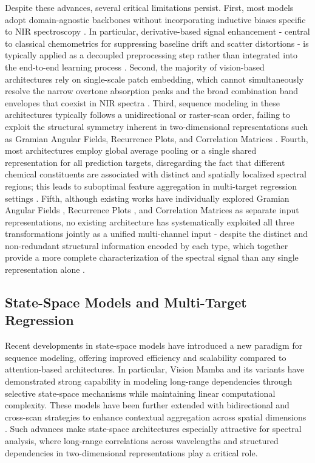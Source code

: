 \documentclass[pdflatex,sn-mathphys-num]{sn-jnl}%
\begin{document}
Despite these advances, several critical limitations persist. First, most models adopt domain-agnostic backbones without incorporating inductive biases specific to NIR spectroscopy \cite{zhang2022review, wang2025nirs}. In particular, derivative-based signal enhancement - central to classical chemometrics for suppressing baseline drift and scatter distortions - is typically applied as a decoupled preprocessing step rather than integrated into the end-to-end learning process \cite{yan2025review, zhang2022review}. Second, the majority of vision-based architectures rely on single-scale patch embedding, which cannot simultaneously resolve the narrow overtone absorption peaks and the broad combination band envelopes that coexist in NIR spectra \cite{pan2024multi, liu2024mspe, li2025multi}. Third, sequence modeling in these architectures typically follows a unidirectional or raster-scan order, failing to exploit the structural symmetry inherent in two-dimensional representations such as Gramian Angular Fields, Recurrence Plots, and Correlation Matrices \cite{mariani2025fusion, deev2024spectrum}. Fourth, most architectures employ global average pooling or a single shared representation for all prediction targets, disregarding the fact that different chemical constituents are associated with distinct and spatially localized spectral regions; this leads to suboptimal feature aggregation in multi-target regression settings \cite{MISHRA2022111741, zhang2022review}. Fifth, although existing works have individually explored Gramian Angular Fields \cite{li2024combined,zhang2025near}, Recurrence Plots \cite{liu2025effective, deev2024spectrum}, and Correlation Matrices \cite{yan2022two, hosseinpour2023cnn} as separate input representations, no existing architecture has systematically exploited all three transformations jointly as a unified multi-channel input - despite the distinct and non-redundant structural information encoded by each type, which together provide a more complete characterization of the spectral signal than any single 
representation alone \cite{zhao2024multiscale}.


\subsection{State-Space Models and Multi-Target Regression}
Recent developments in state-space models have introduced a new paradigm for sequence modeling, offering improved efficiency and scalability compared to attention-based architectures. In particular, Vision Mamba \cite{zhu2024vision} and its variants \cite{bao2026vision,liu2024vmamba,liao2025specspatmamba} have demonstrated strong capability in modeling long-range dependencies through selective state-space mechanisms while maintaining linear computational complexity. These models have been further extended with bidirectional and cross-scan strategies to enhance contextual aggregation across spatial dimensions \cite{liu2024vmamba,sun2024bidirectional}. Such advances make state-space architectures especially attractive for spectral analysis, where long-range correlations across wavelengths and structured dependencies in two-dimensional representations play a critical role.
\end{document}
